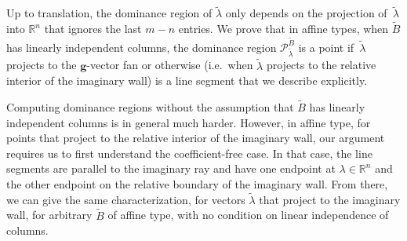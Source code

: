 \documentclass[10pt]{article}
\theoremstyle{definition}
\theoremstyle{remark}
\numberwithin{equation}{section}
\newcommand{\reals}{\mathbb R}
\newcommand{\0}{{\mathbf{0}}}
\newcommand{\g}{\mathbf{g}}
\newcommand{\tB}{{\widetilde{B}}}
\renewcommand{\P}{\mathcal{P}}
\begin{document}
Up to translation, the dominance region of $\tilde\lambda$ only depends on the projection of~$\tilde\lambda$ into $\reals^n$ that ignores the last $m-n$ entries.
We prove that in affine types, when $\tB$ has linearly independent columns, the dominance region $\P_{\tilde\lambda}^\tB$ is a point if~$\tilde\lambda$ projects to the $\g$-vector fan or otherwise (i.e.\ when $\tilde\lambda$ projects to the relative interior of the imaginary wall) is a line segment that we describe explicitly.

Computing dominance regions without the assumption that $\tB$ has linearly independent columns is in general much harder. 
However, in affine type, for points that project to the relative interior of the imaginary wall, our argument requires us to first understand the coefficient-free case.
In that case, the line segments are parallel to the imaginary ray and have one endpoint at $\lambda\in\reals^n$ and the other endpoint on the relative boundary of the imaginary wall.
From there, we can give the same characterization, for vectors $\tilde\lambda$ that project to the imaginary wall, for arbitrary $\tB$ of affine type, with no condition on linear independence of columns.

\end{document}
